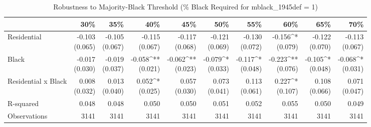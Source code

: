 \begin{table}[h]
\centering
\caption{Robustness to Majority-Black Threshold (\% Black Required for mblack\_1945def = 1)}
\label{tab:mblack_threshold_robustness}
\begin{tabular*}{\textwidth}{@{\extracolsep{\fill}}l*{9}{r}}
\toprule
 & 30\% & 35\% & 40\% & 45\% & 50\% & 55\% & 60\% & 65\% & 70\% \\
\midrule
Residential & \makecell[tr]{-0.103 \\ (0.065)} & \makecell[tr]{-0.105 \\ (0.067)} & \makecell[tr]{-0.115 \\ (0.067)} & \makecell[tr]{-0.117 \\ (0.068)} & \makecell[tr]{-0.121 \\ (0.069)} & \makecell[tr]{-0.130 \\ (0.072)} & \makecell[tr]{-0.156^{*} \\ (0.079)} & \makecell[tr]{-0.122 \\ (0.070)} & \makecell[tr]{-0.113 \\ (0.067)} \\
Black & \makecell[tr]{-0.017 \\ (0.030)} & \makecell[tr]{-0.019 \\ (0.037)} & \makecell[tr]{-0.058^{**} \\ (0.021)} & \makecell[tr]{-0.062^{**} \\ (0.023)} & \makecell[tr]{-0.079^{*} \\ (0.033)} & \makecell[tr]{-0.117^{*} \\ (0.048)} & \makecell[tr]{-0.223^{**} \\ (0.076)} & \makecell[tr]{-0.105^{*} \\ (0.048)} & \makecell[tr]{-0.068^{*} \\ (0.031)} \\
Residential x Black & \makecell[tr]{0.008 \\ (0.032)} & \makecell[tr]{0.013 \\ (0.040)} & \makecell[tr]{0.052^{*} \\ (0.025)} & \makecell[tr]{0.057 \\ (0.030)} & \makecell[tr]{0.073 \\ (0.041)} & \makecell[tr]{0.113 \\ (0.061)} & \makecell[tr]{0.227^{*} \\ (0.107)} & \makecell[tr]{0.108 \\ (0.066)} & \makecell[tr]{0.071 \\ (0.047)} \\
R-squared & 0.048 & 0.048 & 0.050 & 0.050 & 0.051 & 0.052 & 0.055 & 0.050 & 0.049 \\
Observations & 3141 & 3141 & 3141 & 3141 & 3141 & 3141 & 3141 & 3141 & 3141 \\
\bottomrule
\end{tabular*}
\end{table}
